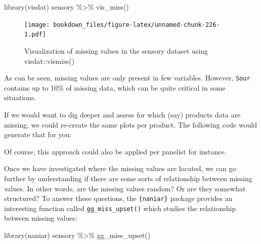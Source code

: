 \documentclass[
]{krantz}
\makeatletter
\newenvironment{Shaded}{\begin{snugshade}}{\end{snugshade}}
\newcommand{\ControlFlowTok}[1]{\textcolor[rgb]{0.27,0.27,0.27}{\textbf{#1}}}
\newcommand{\FunctionTok}[1]{\textcolor[rgb]{0,0,0}{#1}}
\newcommand{\NormalTok}[1]{#1}
\newcommand{\SpecialCharTok}[1]{\textcolor[rgb]{0,0,0}{#1}}
\newenvironment{kframe}{%
\medskip{}
\setlength{\fboxsep}{.8em}
 \def\at@end@of@kframe{}%
 \ifinner\ifhmode%
  \def\at@end@of@kframe{\end{minipage}}%
  \begin{minipage}{\columnwidth}%
 \fi\fi%
 \def\FrameCommand##1{\hskip\@totalleftmargin \hskip-\fboxsep
 \colorbox{shadecolor}{##1}\hskip-\fboxsep
     \hskip-\linewidth \hskip-\@totalleftmargin \hskip\columnwidth}%
 \MakeFramed {\advance\hsize-\width
   \@totalleftmargin\z@ \linewidth\hsize
   \@setminipage}}%
 {\par\unskip\endMakeFramed%
 \at@end@of@kframe}
\renewenvironment{Shaded}{\begin{kframe}}{\end{kframe}}
\makeatother
\begin{document}
\begin{Shaded}
\begin{Highlighting}[]
\FunctionTok{library}\NormalTok{(visdat)}
\NormalTok{sensory }\SpecialCharTok{\%\textgreater{}\%} 
  \FunctionTok{vis\_miss}\NormalTok{()}
\end{Highlighting}
\end{Shaded}

\begin{figure}
\centering
\texttt{[image: bookdown\_files/figure-latex/unnamed-chunk-226-1.pdf]}
\caption{\label{fig:unnamed-chunk-226}Visualization of missing values in the sensory dataset using visdat::vismiss()}
\end{figure}

As can be seen, missing values are only present in few variables. However, \texttt{Sour} contains up to 10\% of missing data, which can be quite critical in some situations.

If we would want to dig deeper and assess for which (say) products data are missing, we could re-create the same plots per product. The following code would generate that for you:

\begin{Shaded}
\end{Shaded}

Of course, this approach could also be applied per panelist for instance.

Once we have investigated where the missing values are located, we can go further by understanding if there are some sorts of relationship between missing values. In other words, are the missing values random? Or are they somewhat structured?
To answer these questions, the \texttt{\{naniar\}} package provides an interesting function called \texttt{gg\_miss\_upset()} which studies the relationship between missing values:

\begin{Shaded}
\begin{Highlighting}[]
\FunctionTok{library}\NormalTok{(naniar)}
\NormalTok{sensory }\SpecialCharTok{\%\textgreater{}\%}
  \FunctionTok{gg\_miss\_upset}\NormalTok{()}
\end{Highlighting}
\end{Shaded}
\end{document}
